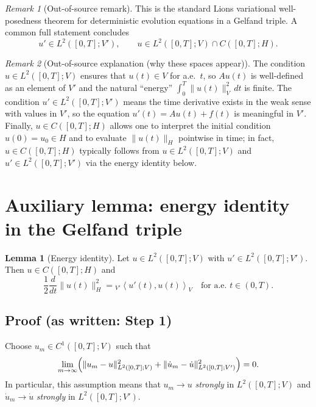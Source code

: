 \documentclass[11pt]{article}
\theoremstyle{definition}
\newtheorem{lemma}{Lemma}
\theoremstyle{remark}
\newtheorem{remark}{Remark}
\begin{document}
\begin{remark}[Out-of-source remark]
This is the standard Lions variational well-posedness theorem for deterministic evolution equations in a Gelfand triple. A common full statement concludes
\[
u' \in L^2([0,T];V'),\qquad
u\in L^2([0,T];V)\cap C([0,T];H).
\]
\end{remark}

\begin{remark}[Out-of-source explanation (why these spaces appear)]
The condition $u\in L^2([0,T];V)$ ensures that $u(t)\in V$ for a.e.\ $t$, so $Au(t)$ is well-defined as an element of $V'$ and the natural ``energy'' $\int_0^T\|u(t)\|_V^2\,dt$ is finite. The condition $u'\in L^2([0,T];V')$ means the time derivative exists in the weak sense with values in $V'$, so the equation $u'(t)=Au(t)+f(t)$ is meaningful in $V'$. Finally, $u\in C([0,T];H)$ allows one to interpret the initial condition $u(0)=u_0\in H$ and to evaluate $\|u(t)\|_H$ pointwise in time; in fact, $u\in C([0,T];H)$ typically follows from $u\in L^2([0,T];V)$ and $u'\in L^2([0,T];V')$ via the energy identity below.
\end{remark}

\section*{Auxiliary lemma: energy identity in the Gelfand triple}

\begin{lemma}[Energy identity]
Let $u\in L^2([0,T];V)$ with $u'\in L^2([0,T];V')$. Then $u\in C([0,T];H)$ and
\[
\frac12\frac{d}{dt}\|u(t)\|_H^2
=
{}_{V'}\left\langle u'(t),u(t)\right\rangle_{V}
\quad \text{for a.e.\ }t\in(0,T).
\]
\end{lemma}

\subsection*{Proof (as written: Step 1)}

Choose $u_m\in C^1([0,T];V)$ such that
\[
\lim_{m\to\infty}
\Bigl(
\|u_m-u\|_{L^2([0,T];V)}^2
+
\|\dot u_m-\dot u\|_{L^2([0,T];V')}^2
\Bigr)=0.
\]
\noindent
In particular, this assumption means that $u_m\to u$ \emph{strongly} in $L^2([0,T];V)$ and $\dot u_m\to \dot u$ \emph{strongly} in $L^2([0,T];V')$.
\end{document}
